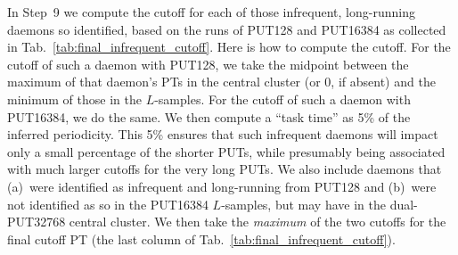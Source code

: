 \documentclass[letter]{ieice}
\begin{document}
In Step~9 we compute 
the cutoff for each of those infrequent, long-running daemons so
identified, based on {\color{blue}the runs of PUT128 and 
PUT16384} as collected in Tab.~\ref{tab:final_infrequent_cutoff}. 
Here is how to compute the cutoff. For the cutoff of such a daemon with PUT128, 
we take the \hbox{midpoint} between the maximum of that daemon's PTs in the 
central cluster (or 0, if absent) and the \hbox{minimum} of those in the $L$-samples. 
For the cutoff of such a daemon with PUT16384, we do the same. 
We then compute a ``task time'' as 5\% of the inferred periodicity. 
This 5\% ensures that such infrequent daemons will impact 
only a small percentage of the shorter PUTs, while presumably being 
associated with much larger cutoffs for the very long PUTs. 
We also include daemons that (a)~were identified as infrequent and 
\hbox{long-running} from PUT128 and (b)~were not identified as so in the PUT16384 
\hbox{$L$-samples}, but may have in the \hbox{dual-PUT32768} central cluster.
We then take the {\em maximum} of the two cutoffs for the final cutoff PT 
(the last column of Tab.~\ref{tab:final_infrequent_cutoff}). 
\end{document}
